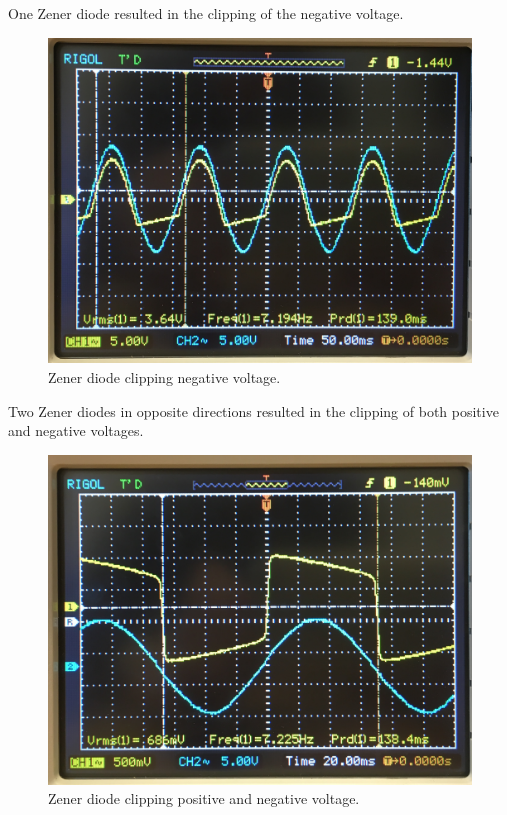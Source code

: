 \documentclass[twocolumn, amsmath]{revtex4}
\begin{document}
One Zener diode resulted in the clipping of the negative voltage.
\begin{figure}[h]
    \includegraphics[scale=0.06]{zener2}  
    \caption{Zener diode clipping negative voltage.}
\end{figure}
Two Zener diodes in opposite directions resulted in the clipping of both positive and negative voltages.
\begin{figure}[h]
    \includegraphics[scale=0.06]{zener1}  
    \caption{Zener diode clipping positive and negative voltage.}
\end{figure}
\end{document}
